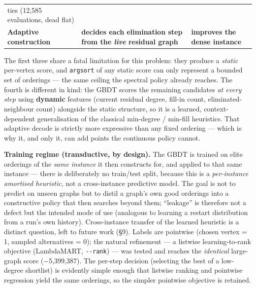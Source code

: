 \documentclass[
  11pt,
]{article}
\begin{document}
\begin{longtable}[]{@{}lll@{}}
\begin{minipage}[t]{0.30\columnwidth}
ties (12,585 evaluations, dead flat)\strut
\end{minipage}\tabularnewline
\begin{minipage}[t]{0.30\columnwidth}\raggedright
\textbf{Adaptive construction}\strut
\end{minipage} & \begin{minipage}[t]{0.30\columnwidth}\raggedright
\textbf{decides each elimination step from the \emph{live} residual
graph}\strut
\end{minipage} & \begin{minipage}[t]{0.30\columnwidth}\raggedright
\textbf{improves the dense instance}\strut
\end{minipage}\tabularnewline
\bottomrule
\end{longtable}

The first three share a fatal limitation for this problem: they produce
a \emph{static} per-vertex score, and \texttt{argsort} of any static
score can only represent a bounded set of orderings --- the same ceiling
the spectral policy already reaches. The fourth is different in kind:
the GBDT scores the remaining candidates \emph{at every step} using
\textbf{dynamic} features (current residual degree, fill-in count,
eliminated-neighbour count) alongside the static structure, so it is a
learned, context-dependent generalisation of the classical min-degree /
min-fill heuristics. That adaptive decode is strictly more expressive
than any fixed ordering --- which is why it, and only it, can add points
the continuous policy cannot.

\textbf{Training regime (transductive, by design).} The GBDT is trained
on elite orderings of the \emph{same instance} it then constructs for,
and applied to that same instance --- there is deliberately no
train/test split, because this is a \emph{per-instance amortised
heuristic}, not a cross-instance predictive model. The goal is not to
predict on unseen graphs but to distil a graph's own good orderings into
a constructive policy that then searches beyond them; ``leakage'' is
therefore not a defect but the intended mode of use (analogous to
learning a restart distribution from a run's own history).
Cross-instance transfer of the learned heuristic is a distinct question,
left to future work (§9). Labels are pointwise (chosen vertex = 1,
sampled alternatives = 0); the natural refinement --- a listwise
learning-to-rank objective (LambdaMART, \texttt{-\/-rank}) --- was
tested and reaches the \emph{identical} large-graph score (−5,399,387).
The per-step decision (selecting the best of a low-degree shortlist) is
evidently simple enough that listwise ranking and pointwise regression
yield the same orderings, so the simpler pointwise objective is
retained.
\end{document}
